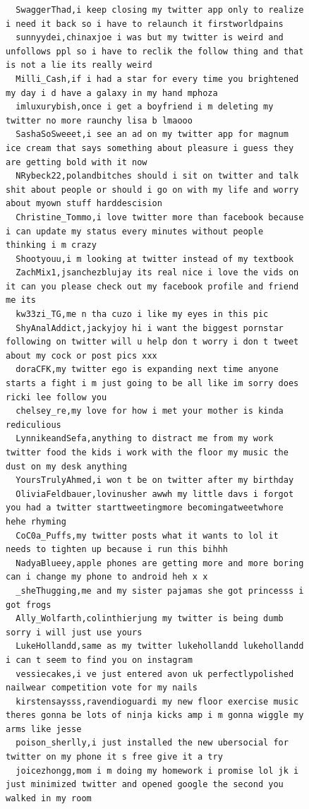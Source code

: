 \begin{figure}[htpb]
\begin{verbatim}
  SwaggerThad,i keep closing my twitter app only to realize i need it back so i have to relaunch it firstworldpains
  sunnyydei,chinaxjoe i was but my twitter is weird and unfollows ppl so i have to reclik the follow thing and that is not a lie its really weird
  Milli_Cash,if i had a star for every time you brightened my day i d have a galaxy in my hand mphoza
  imluxurybish,once i get a boyfriend i m deleting my twitter no more raunchy lisa b lmaooo
  SashaSoSweeet,i see an ad on my twitter app for magnum ice cream that says something about pleasure i guess they are getting bold with it now
  NRybeck22,polandbitches should i sit on twitter and talk shit about people or should i go on with my life and worry about myown stuff harddescision
  Christine_Tommo,i love twitter more than facebook because i can update my status every minutes without people thinking i m crazy
  Shootyouu,i m looking at twitter instead of my textbook
  ZachMix1,jsanchezblujay its real nice i love the vids on it can you please check out my facebook profile and friend me its
  kw33zi_TG,me n tha cuzo i like my eyes in this pic
  ShyAnalAddict,jackyjoy hi i want the biggest pornstar following on twitter will u help don t worry i don t tweet about my cock or post pics xxx
  doraCFK,my twitter ego is expanding next time anyone starts a fight i m just going to be all like im sorry does ricki lee follow you
  chelsey_re,my love for how i met your mother is kinda rediculious
  LynnikeandSefa,anything to distract me from my work twitter food the kids i work with the floor my music the dust on my desk anything
  YoursTrulyAhmed,i won t be on twitter after my birthday
  OliviaFeldbauer,lovinusher awwh my little davs i forgot you had a twitter starttweetingmore becomingatweetwhore hehe rhyming
  CoC0a_Puffs,my twitter posts what it wants to lol it needs to tighten up because i run this bihhh
  NadyaBlueey,apple phones are getting more and more boring can i change my phone to android heh x x
  _sheThugging,me and my sister pajamas she got princesss i got frogs
  Ally_Wolfarth,colinthierjung my twitter is being dumb sorry i will just use yours
  LukeHollandd,same as my twitter lukehollandd lukehollandd i can t seem to find you on instagram
  vessiecakes,i ve just entered avon uk perfectlypolished nailwear competition vote for my nails
  kirstensaysss,ravendioguardi my new floor exercise music theres gonna be lots of ninja kicks amp i m gonna wiggle my arms like jesse
  poison_sherlly,i just installed the new ubersocial for twitter on my phone it s free give it a try
  joicezhongg,mom i m doing my homework i promise lol jk i just minimized twitter and opened google the second you walked in my room

\end{verbatim}
\end{figure}
